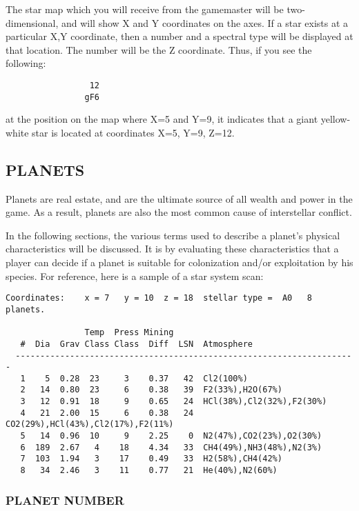\documentclass[10pt,titlepage]{article}
\begin{document}
The star map which you will receive from the gamemaster will be two-
dimensional, and will show X and Y coordinates on the axes.  If a star exists
at a particular X,Y coordinate, then a number and a spectral type will be
displayed at that location.  The number will be the Z coordinate.  Thus,
if you see the following:

\begin{verbatim}
				 12
				gF6
\end{verbatim}

at the position on the map where X=5 and Y=9, it indicates that a giant yellow-
white star is located at coordinates X=5, Y=9, Z=12.


\subsection{PLANETS}

Planets are real estate, and are the ultimate source of all wealth and power in
the game.  As a result, planets are also the most common cause of interstellar
conflict.

In the following sections, the various terms used to describe a planet's
physical characteristics will be discussed.  It is by evaluating these
characteristics that a player can decide if a planet is suitable for
colonization and/or exploitation by his species.  For reference, here is
a sample of a star system scan:

\begin{verbatim}
Coordinates:	x = 7	y = 10	z = 18	stellar type =  A0   8 planets.

                Temp  Press Mining
   #  Dia  Grav Class Class  Diff  LSN  Atmosphere
  ---------------------------------------------------------------------
   1    5  0.28  23     3    0.37   42  Cl2(100%)
   2   14  0.80  23     6    0.38   39  F2(33%),H2O(67%)
   3   12  0.91  18     9    0.65   24  HCl(38%),Cl2(32%),F2(30%)
   4   21  2.00  15     6    0.38   24  CO2(29%),HCl(43%),Cl2(17%),F2(11%)
   5   14  0.96  10     9    2.25    0  N2(47%),CO2(23%),O2(30%)
   6  189  2.67   4    18    4.34   33  CH4(49%),NH3(48%),N2(3%)
   7  103  1.94   3    17    0.49   33  H2(58%),CH4(42%)
   8   34  2.46   3    11    0.77   21  He(40%),N2(60%)
\end{verbatim}

\subsubsection{PLANET NUMBER}
\end{document}
